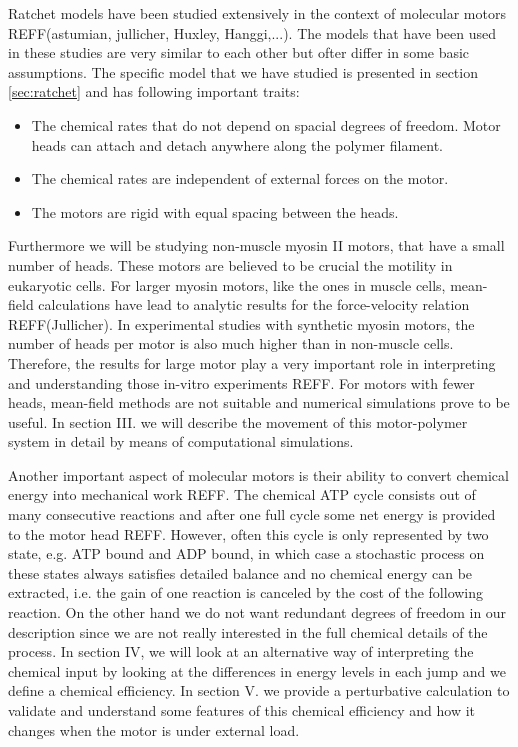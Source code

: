 \documentclass[aps,pre,twocolumn,showpacs,showkeys,a4paper]{revtex4}
\begin{document}
Ratchet models have been studied extensively in the context of molecular motors REFF(astumian, jullicher, Huxley, Hanggi,...). %
The models that have been used in these studies are very similar to each other but ofter differ in some basic assumptions.
The specific model that we have studied is presented in section \ref{sec:ratchet} and has following important traits:
\begin{itemize}
\item The chemical rates that do not depend on spacial degrees of freedom. 
Motor heads can attach and detach anywhere along the polymer filament.
\item The chemical rates are independent of external forces on the motor.
\item The motors are rigid with equal spacing between the heads.
\end{itemize} 
Furthermore we will be studying non-muscle myosin II motors, that have a small number of heads. 
These motors are believed to be crucial the motility in eukaryotic cells.
For larger myosin motors, like the ones in muscle cells, mean-field calculations have lead to analytic results for the force-velocity relation REFF(Jullicher). %
In experimental studies with synthetic myosin motors, the number of heads per motor is also much higher than in non-muscle cells. 
Therefore, the results for large motor play a very important role in interpreting and understanding those in-vitro experiments REFF. %
For motors with fewer heads, mean-field methods are not suitable and numerical simulations prove to be useful.
In section III. we will describe the movement of this motor-polymer system in detail by means of computational simulations. %


Another important aspect of molecular motors is their ability to convert chemical energy into mechanical work REFF. %
The chemical ATP cycle consists out of many consecutive reactions and after one full cycle some net energy is provided to the motor head REFF. %
However, often this cycle is only represented by two state, e.g. ATP bound and ADP bound, 
in which case a stochastic process on these states always satisfies detailed balance and no chemical energy can be extracted, 
i.e. the gain of one reaction is canceled by the cost of the following reaction.
On the other hand we do not want redundant degrees of freedom in our description since we are not really interested in the full chemical details of the process.
In section IV, we will look at an alternative way of interpreting the chemical input by looking at the differences in energy levels in each jump and we define a chemical efficiency. %
In section V. we provide a perturbative calculation to validate and understand some features of this chemical efficiency and how it changes when the motor is under external load. %
\end{document}
